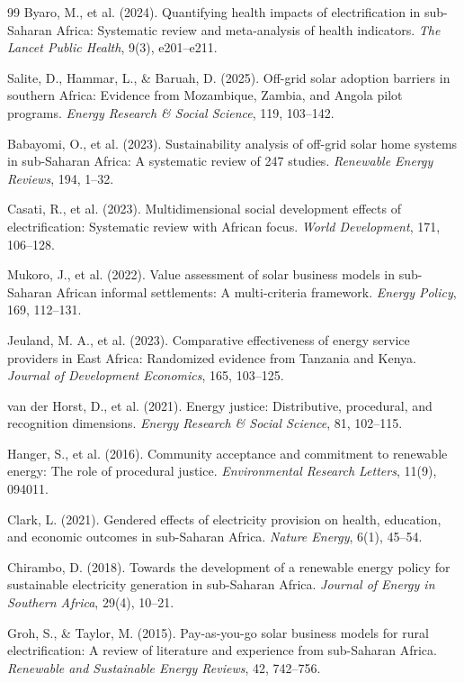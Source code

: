 \documentclass[12pt, a4paper]{article}
\begin{document}
\begin{thebibliography}{99}
 Byaro, M., et al. (2024). Quantifying health impacts of electrification in sub-Saharan Africa: Systematic review and meta-analysis of health indicators. \textit{The Lancet Public Health}, 9(3), e201--e211.

 Salite, D., Hammar, L., \& Baruah, D. (2025). Off-grid solar adoption barriers in southern Africa: Evidence from Mozambique, Zambia, and Angola pilot programs. \textit{Energy Research \& Social Science}, 119, 103--142.

 Babayomi, O., et al. (2023). Sustainability analysis of off-grid solar home systems in sub-Saharan Africa: A systematic review of 247 studies. \textit{Renewable Energy Reviews}, 194, 1--32.

 Casati, R., et al. (2023). Multidimensional social development effects of electrification: Systematic review with African focus. \textit{World Development}, 171, 106--128.

 Mukoro, J., et al. (2022). Value assessment of solar business models in sub-Saharan African informal settlements: A multi-criteria framework. \textit{Energy Policy}, 169, 112--131.

 Jeuland, M. A., et al. (2023). Comparative effectiveness of energy service providers in East Africa: Randomized evidence from Tanzania and Kenya. \textit{Journal of Development Economics}, 165, 103--125.

 van der Horst, D., et al. (2021). Energy justice: Distributive, procedural, and recognition dimensions. \textit{Energy Research \& Social Science}, 81, 102--115.

 Hanger, S., et al. (2016). Community acceptance and commitment to renewable energy: The role of procedural justice. \textit{Environmental Research Letters}, 11(9), 094011.

 Clark, L. (2021). Gendered effects of electricity provision on health, education, and economic outcomes in sub-Saharan Africa. \textit{Nature Energy}, 6(1), 45--54.

 Chirambo, D. (2018). Towards the development of a renewable energy policy for sustainable electricity generation in sub-Saharan Africa. \textit{Journal of Energy in Southern Africa}, 29(4), 10--21.

 Groh, S., \& Taylor, M. (2015). Pay-as-you-go solar business models for rural electrification: A review of literature and experience from sub-Saharan Africa. \textit{Renewable and Sustainable Energy Reviews}, 42, 742--756.


\end{thebibliography}
\end{document}
